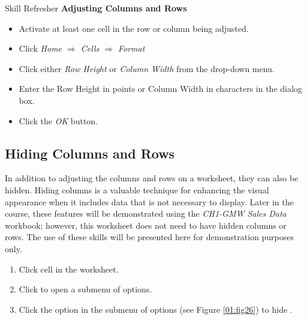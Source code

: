 \begin{center}
	\begin{sklbox}{Skill Refresher}
		\textbf{Adjusting Columns and Rows}
		\\
		\begin{itemize}
			\setlength{\itemsep}{0pt}
			\setlength{\parskip}{0pt}
			\setlength{\parsep}{0pt}
			
			\item Activate at least one cell in the row or column being adjusted.
			\item Click \textit{Home $ \Rightarrow $ Cells $ \Rightarrow $ Format}
			\item Click either \textit{Row Height} or \textit{Column Width} from the drop-down menu.
			\item Enter the Row Height in points or Column Width in characters in the dialog box.
			\item Click the \textit{OK} button.
			
		\end{itemize}
	\end{sklbox}
\end{center}

\subsection{Hiding Columns and Rows}

In addition to adjusting the columns and rows on a worksheet, they can also be hidden. Hiding columns is a valuable technique for enhancing the visual appearance when it includes data that is not necessary to display. Later in the course, these features will be demonstrated using the \textit{CH1-GMW Sales Data} workbook; however, this worksheet does not need to have hidden columns or rows. The use of these skills will be presented here for demonstration purposes only.

\begin{enumbox}
	\begin{enumerate}
		\item Click cell  in the  worksheet.
		\item Click  to open a submenu of options.
		\item Click the  option in the submenu of options (see Figure \ref{01:fig26}) to hide .
	\end{enumerate}
\end{enumbox}

